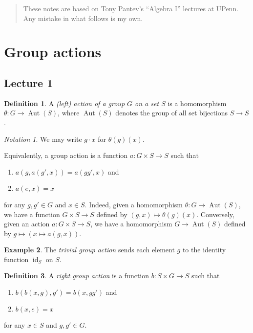 \documentclass[10pt,letterpaper,cm]{nupset}
\theoremstyle{definition}
\newtheorem{definition}{Definition}[subsection]
\newtheorem{exmp}[definition]{Example}
\theoremstyle{theorem}
\theoremstyle{remark}
\newtheorem*{notation}{Notation}
\newcommand{\1}{\mathbf{1}}
\newcommand{\0}{\vec 0}
\DeclareMathOperator{\id}{\mathrm{id}}
\DeclareMathOperator{\aut}{Aut}
\begin{document}
\thispagestyle{empty}
\begin{abstract}
These notes are based on Tony Pantev's ``Algebra I'' lectures at UPenn. Any mistake in what follows is my own.
\end{abstract}

\tableofcontents
\newpage

\section{Group actions}

\subsection{Lecture 1}

\begin{definition} 
A \textit{(left) action of a group $G$ on a set $S$} is a homomorphism $\theta : G \to \aut(S)$, where $ \aut(S)$ denotes the group of all set bijections $S\to S$. 
\end{definition}

\begin{notation}
We may write $g\cdot x$ for $\theta(g)(x)$.
\end{notation}

\smallskip

Equivalently, a group action is a function $a : G \times S \to S$ such that 
\begin{enumerate}[label=(\roman*)]
\item $a(g, a(g', x)) = a(gg', x)$ and
\item $a(e, x) = x$
\end{enumerate}
for any $g,g' \in G$ and $x\in S$. 
Indeed, given a homomorphism $\theta : G \to \aut(S)$, we have a function $G\times S \to S$ defined by  $\left(g, x\right) \mapsto \theta(g)(x)$. Conversely, given an action $a : G\times S \to S$, we have a homomorphism $G \to \aut(S)$ defined by $g \mapsto \left(x \mapsto a(g, x)\right)$.


\begin{exmp}
The \textit{trivial group action} sends each element $g$ to the identity function $\id_S$ on $S$.
\end{exmp}


\begin{definition}
A \textit{right group action} is a function $b: S \times G \to S$ such that 
\begin{enumerate}[label=(\roman*)]
\item $b(b(x, g), g') = b(x, gg')$ and
\item $b(x, e) = x$
\end{enumerate}
for any $x\in S$ and $g,g' \in G$. 
\end{definition}
\end{document}

